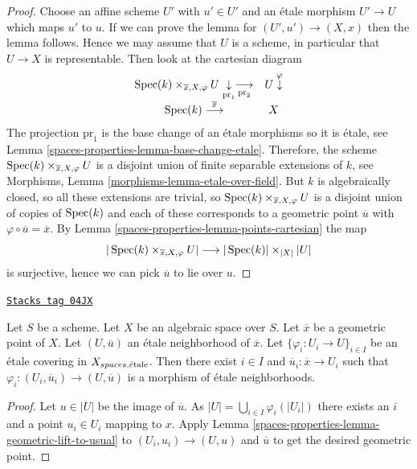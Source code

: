 \begin{proof}
Choose an affine scheme $U'$ with $u' \in U'$ and an \'etale morphism
$U' \to U$ which maps $u'$ to $u$. If we can prove the lemma for
$(U', u') \to (X, x)$ then the lemma follows. Hence we may assume that
$U$ is a scheme, in particular that $U \to X$ is representable.
Then look at the cartesian diagram
$$
\begin{array}{cc}\operatorname{Spec}(k) \times_{\overline{x}, X, \varphi} U
\underset{\text{pr}_1}{\downarrow}\underset{\text{pr}_2}{\longrightarrow} & U
\overset{\varphi}{\downarrow} \\ \operatorname{Spec}(k) \overset{\overline{x}}{\longrightarrow} & X\end{array}
$$
The projection $\text{pr}_1$ is the base change of an \'etale morphisms
so it is \'etale, see
Lemma \ref{spaces-properties-lemma-base-change-etale}.
Therefore, the scheme $\operatorname{Spec}(k) \times_{\overline{x}, X, \varphi} U$
is a disjoint union of finite separable extensions of $k$, see
Morphisms, Lemma \ref{morphisms-lemma-etale-over-field}.
But $k$ is algebraically closed, so all these extensions are trivial,
so $\operatorname{Spec}(k) \times_{\overline{x}, X, \varphi} U$
is a disjoint union of copies of $\operatorname{Spec}(k)$ and each of
these corresponds to a geometric point $\overline{u}$ with
$\varphi \circ \overline{u} = \overline{x}$. By
Lemma \ref{spaces-properties-lemma-points-cartesian}
the map
$$
|\operatorname{Spec}(k) \times_{\overline{x}, X, \varphi} U|
\longrightarrow
|\operatorname{Spec}(k)| \times_{|X|} |U|
$$
is surjective, hence we can pick $\overline{u}$ to lie over $u$.
\end{proof}

\begin{lemma}
\label{spaces-properties-lemma-geometric-lift-to-cover}
\href{https://stacks.math.columbia.edu/tag/04JX}{\texttt{Stacks tag 04JX}}

Let $S$ be a scheme. Let $X$ be an algebraic space over $S$.
Let $\overline{x}$ be a geometric point of $X$.
Let $(U, \overline{u})$ an \'etale neighborhood of $\overline{x}$.
Let $\{\varphi_i : U_i \to U\}_{i \in I}$ be an \'etale covering in
$X_{spaces, \acute{e}\text{tale}}$.
Then there exist $i \in I$ and $\overline{u}_i : \overline{x} \to U_i$
such that $\varphi_i : (U_i, \overline{u}_i) \to (U, \overline{u})$
is a morphism of \'etale neighborhoods.
\end{lemma}

\begin{proof}
Let $u \in |U|$ be the image of $\overline{u}$.
As $|U| = \bigcup_{i \in I} \varphi_i(|U_i|)$ there exists an
$i$ and a point $u_i \in U_i$ mapping to $x$. Apply
Lemma \ref{spaces-properties-lemma-geometric-lift-to-usual}
to $(U_i, u_i) \to (U, u)$ and $\overline{u}$ to
get the desired geometric point.
\end{proof}

